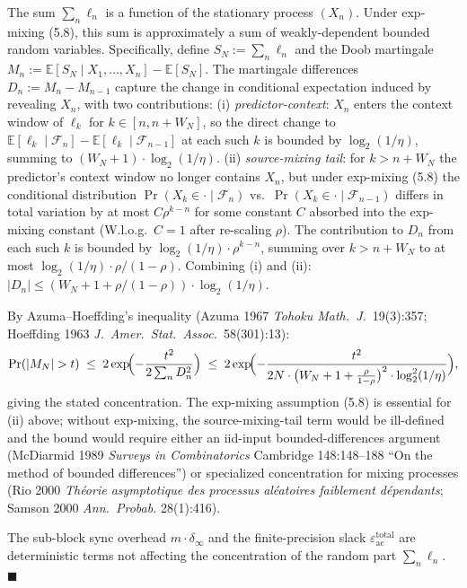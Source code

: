 \documentclass[
]{article}
\begin{document}
The sum $\sum_n \ell_n$ is a function of the stationary process
$(X_n)$. Under exp-mixing (5.8), this sum is approximately a sum of
weakly-dependent bounded random variables. Specifically, define
$S_N := \sum_n \ell_n$ and the Doob martingale
$M_n := \mathbb{E}[S_N \mid X_1, \ldots, X_n] - \mathbb{E}[S_N]$.
The martingale differences $D_n := M_n - M_{n-1}$ capture the change
in conditional expectation induced by revealing $X_n$, with two
contributions:
(i) \emph{predictor-context}: $X_n$ enters the context window of $\ell_k$
for $k \in [n, n + W_N]$, so the direct change to $\mathbb{E}[\ell_k \mid
\mathcal{F}_n] - \mathbb{E}[\ell_k \mid \mathcal{F}_{n-1}]$ at each such
$k$ is bounded by $\log_2(1/\eta)$, summing to
$(W_N+1) \cdot \log_2(1/\eta)$.
(ii) \emph{source-mixing tail}: for $k > n + W_N$ the predictor's
context window no longer contains $X_n$, but under exp-mixing (5.8)
the conditional distribution $\Pr(X_k \in \cdot \mid \mathcal{F}_n)$ vs.\
$\Pr(X_k \in \cdot \mid \mathcal{F}_{n-1})$ differs in total variation
by at most $C \rho^{k-n}$ for some constant $C$ absorbed into the
exp-mixing constant (W.l.o.g.\ $C = 1$ after re-scaling $\rho$). The
contribution to $D_n$ from each such $k$ is bounded by
$\log_2(1/\eta) \cdot \rho^{k-n}$, summing over $k > n + W_N$ to at most
$\log_2(1/\eta) \cdot \rho/(1-\rho)$.
Combining (i) and (ii):
$|D_n| \leq (W_N + 1 + \rho/(1-\rho)) \cdot \log_2(1/\eta)$.

By Azuma--Hoeffding's inequality (Azuma 1967 \emph{Tohoku Math.\ J.}\
19(3):357; Hoeffding 1963 \emph{J.\ Amer.\ Stat.\ Assoc.}\
58(301):13):
\[
\Pr(|M_N| > t) \;\leq\; 2 \exp\!\Bigl(-\frac{t^2}{2 \sum_n D_n^2}\Bigr)
\;\leq\;
2 \exp\!\Bigl(-\frac{t^2}{2 N \cdot \bigl(W_N + 1 + \tfrac{\rho}{1-\rho}\bigr)^2 \cdot \log_2^2(1/\eta)}\Bigr),
\]
giving the stated concentration. The exp-mixing assumption (5.8)
is essential for (ii) above; without exp-mixing, the
source-mixing-tail term would be ill-defined and the bound would
require either an iid-input bounded-differences argument
(McDiarmid 1989 \emph{Surveys in Combinatorics} Cambridge
148:148--188 ``On the method of bounded differences'') or
specialized concentration for mixing processes (Rio 2000
\emph{Th\'eorie asymptotique des processus al\'eatoires faiblement
d\'ependants}; Samson 2000 \emph{Ann.\ Probab.} 28(1):416).

The sub-block sync overhead $m \cdot \delta_\infty$ and the
finite-precision slack $\varepsilon_{\mathrm{ac}}^{\mathrm{total}}$
are deterministic terms not affecting the concentration of the
random part $\sum_n \ell_n$.
\hfill$\blacksquare$
\end{document}
